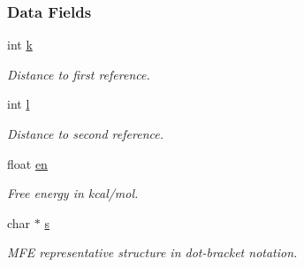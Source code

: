 \subsubsection*{Data Fields}
\begin{DoxyCompactItemize}
\item 
int \hyperlink{group__kl__neighborhood__mfe_ac111e850bb3b3a11b6b5707912cfa1b8}{k}\hypertarget{group__kl__neighborhood__mfe_ac111e850bb3b3a11b6b5707912cfa1b8}{}\label{group__kl__neighborhood__mfe_ac111e850bb3b3a11b6b5707912cfa1b8}

\begin{DoxyCompactList}\small\item\em Distance to first reference. \end{DoxyCompactList}\item 
int \hyperlink{group__kl__neighborhood__mfe_ab8e95cd920901175a2cc8de726ab1d36}{l}\hypertarget{group__kl__neighborhood__mfe_ab8e95cd920901175a2cc8de726ab1d36}{}\label{group__kl__neighborhood__mfe_ab8e95cd920901175a2cc8de726ab1d36}

\begin{DoxyCompactList}\small\item\em Distance to second reference. \end{DoxyCompactList}\item 
float \hyperlink{group__kl__neighborhood__mfe_a7577863a6a84224dfee39b321c03cab1}{en}\hypertarget{group__kl__neighborhood__mfe_a7577863a6a84224dfee39b321c03cab1}{}\label{group__kl__neighborhood__mfe_a7577863a6a84224dfee39b321c03cab1}

\begin{DoxyCompactList}\small\item\em Free energy in kcal/mol. \end{DoxyCompactList}\item 
char $\ast$ \hyperlink{group__kl__neighborhood__mfe_ac5942d2505a6cd7e4a8073a321d5d2d5}{s}\hypertarget{group__kl__neighborhood__mfe_ac5942d2505a6cd7e4a8073a321d5d2d5}{}\label{group__kl__neighborhood__mfe_ac5942d2505a6cd7e4a8073a321d5d2d5}

\begin{DoxyCompactList}\small\item\em M\+FE representative structure in dot-\/bracket notation. \end{DoxyCompactList}\end{DoxyCompactItemize}
\label{structTwoDfold__vars}
\hypertarget{group__kl__neighborhood__mfe_structTwoDfold__vars}{}

